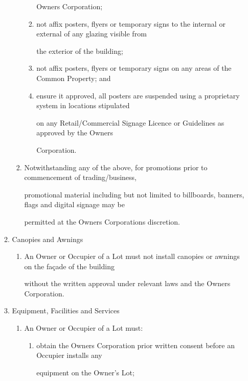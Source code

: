 \documentclass{article}
\begin{document}
\begin{enumerate}[label=\arabic*.]
\begin{enumerate}[label=\arabic{enumi}.\arabic*.]
\begin{enumerate}[label=(\arabic*)]
\begin{enumerate}[label=(\alph*)]
Owners Corporation; 

\item  not affix posters, flyers or temporary signs to the internal or external of any glazing visible from 

the exterior of the building; 

\item  not affix posters, flyers or temporary signs on any areas of the Common Property; and 

\item  ensure it approved, all posters are suspended using a proprietary system in locations stipulated 

on any Retail/Commercial Signage Licence or Guidelines as approved by the Owners 

Corporation. 

\end{enumerate}
\item  Notwithstanding any of the above, for promotions prior to commencement of trading/business, 

promotional material including but not limited to billboards, banners, flags and digital signage may be 

permitted at the Owners Corporations discretion. 

\newpage

\end{enumerate}
\item  Canopies and Awnings 

\begin{enumerate}[label=(\arabic*)]
\item  An Owner or Occupier of a Lot must not install canopies or awnings on the façade of the building 

without the written approval under relevant laws and the Owners Corporation. 

\end{enumerate}
\item  Equipment, Facilities and Services 

\begin{enumerate}[label=(\arabic*)]
\item  An Owner or Occupier of a Lot must: 

\begin{enumerate}[label=(\alph*)]
\item  obtain the Owners Corporation prior written consent before an Occupier installs any 

equipment on the Owner’s Lot; 


\end{enumerate}
\end{enumerate}
\end{enumerate}
\end{enumerate}
\end{document}
